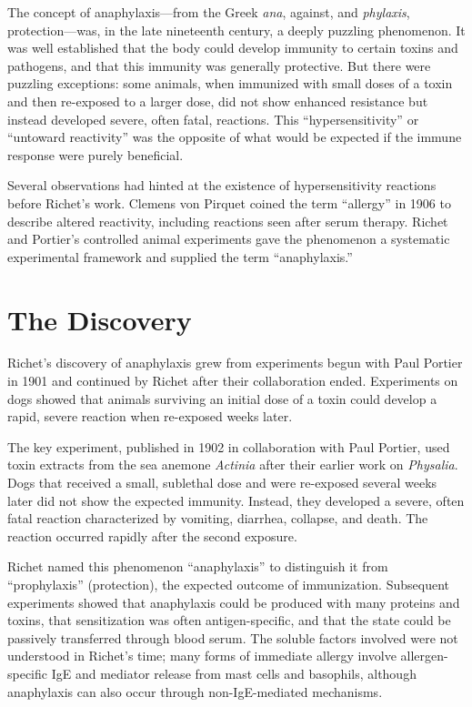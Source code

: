 The concept of anaphylaxis---from the Greek \emph{ana}, against, and \emph{phylaxis}, protection---was, in the late nineteenth century, a deeply puzzling phenomenon. It was well established that the body could develop immunity to certain toxins and pathogens, and that this immunity was generally protective. But there were puzzling exceptions: some animals, when immunized with small doses of a toxin and then re-exposed to a larger dose, did not show enhanced resistance but instead developed severe, often fatal, reactions. This ``hypersensitivity'' or ``untoward reactivity'' was the opposite of what would be expected if the immune response were purely beneficial.

Several observations had hinted at the existence of hypersensitivity reactions before Richet's work. Clemens von Pirquet coined the term ``allergy'' in 1906 to describe altered reactivity, including reactions seen after serum therapy. Richet and Portier's controlled animal experiments gave the phenomenon a systematic experimental framework and supplied the term ``anaphylaxis.''\cite{richet-history}

\section{The Discovery}

Richet's discovery of anaphylaxis grew from experiments begun with Paul Portier in 1901 and continued by Richet after their collaboration ended. Experiments on dogs showed that animals surviving an initial dose of a toxin could develop a rapid, severe reaction when re-exposed weeks later.\cite{richet-lecture}

The key experiment, published in 1902 in collaboration with Paul Portier, used toxin extracts from the sea anemone \emph{Actinia} after their earlier work on \emph{Physalia}. Dogs that received a small, sublethal dose and were re-exposed several weeks later did not show the expected immunity. Instead, they developed a severe, often fatal reaction characterized by vomiting, diarrhea, collapse, and death. The reaction occurred rapidly after the second exposure.\cite{richet-lecture,richet-history}

Richet named this phenomenon ``anaphylaxis'' to distinguish it from ``prophylaxis'' (protection), the expected outcome of immunization. Subsequent experiments showed that anaphylaxis could be produced with many proteins and toxins, that sensitization was often antigen-specific, and that the state could be passively transferred through blood serum. The soluble factors involved were not understood in Richet's time; many forms of immediate allergy involve allergen-specific IgE and mediator release from mast cells and basophils, although anaphylaxis can also occur through non-IgE-mediated mechanisms.\cite{richet-lecture,richet-immunology}

